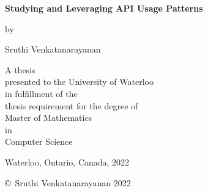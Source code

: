 \pagestyle{empty}

\begin{titlepage}
        \begin{center}
        \vspace*{1.0cm}

        \Huge
        {\bf Studying and Leveraging API Usage Patterns}

        \vspace*{1.0cm}

        \normalsize
        by \\

        \vspace*{1.0cm}

        \Large
        Sruthi Venkatanarayanan \\

        \vspace*{3.0cm}

        \normalsize
        A thesis \\
        presented to the University of Waterloo \\ 
        in fulfillment of the \\
        thesis requirement for the degree of \\
        Master of Mathematics \\
        in \\
        Computer Science \\

        \vspace*{2.0cm}

        Waterloo, Ontario, Canada, 2022 \\

        \vspace*{1.0cm}

        \copyright\ Sruthi Venkatanarayanan 2022 \\
        \end{center}
\end{titlepage}

\pagestyle{plain}
\setcounter{page}{2}

